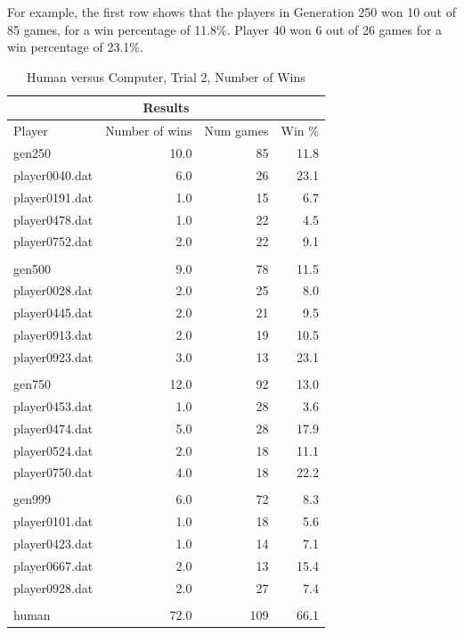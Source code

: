 For example, the first row shows that the players in Generation 250 won 10 out
of 85 games, for a win percentage of 11.8\%. Player 40 won 6 out of 26 games for
a win percentage of 23.1\%.

\begin{table}[htbp]
  \centering
  \caption{Human versus Computer, Trial 2, Number of Wins}
    \begin{tabular}{lrrr}
    \toprule
    \multicolumn{4}{c}{Results} \\
    \midrule
    Player & Number of wins & Num games & Win \% \\
    \midrule
    \multicolumn{1}{l}{gen250}         & 10.0 & 85 & 11.8 \\
    \multicolumn{1}{l}{player0040.dat} & 6.0  & 26 & 23.1 \\
    \multicolumn{1}{l}{player0191.dat} & 1.0  & 15 & 6.7 \\
    \multicolumn{1}{l}{player0478.dat} & 1.0  & 22 & 4.5 \\
    \multicolumn{1}{l}{player0752.dat} & 2.0  & 22 & 9.1 \\ \\
    \multicolumn{1}{l}{gen500}         & 9.0  & 78  & 11.5  \\
    \multicolumn{1}{l}{player0028.dat} & 2.0  & 25  & 8.0  \\
    \multicolumn{1}{l}{player0445.dat} & 2.0  & 21  & 9.5  \\
    \multicolumn{1}{l}{player0913.dat} & 2.0  & 19  & 10.5  \\
    \multicolumn{1}{l}{player0923.dat} & 3.0  & 13  & 23.1  \\ \\
    \multicolumn{1}{l}{gen750}         & 12.0 & 92  & 13.0  \\
    \multicolumn{1}{l}{player0453.dat} & 1.0  & 28  & 3.6  \\
    \multicolumn{1}{l}{player0474.dat} & 5.0  & 28  & 17.9  \\
    \multicolumn{1}{l}{player0524.dat} & 2.0  & 18  & 11.1  \\
    \multicolumn{1}{l}{player0750.dat} & 4.0  & 18  & 22.2  \\ \\
    \multicolumn{1}{l}{gen999}         & 6.0  & 72  & 8.3  \\
    \multicolumn{1}{l}{player0101.dat} & 1.0  & 18  & 5.6  \\
    \multicolumn{1}{l}{player0423.dat} & 1.0  & 14  & 7.1  \\
    \multicolumn{1}{l}{player0667.dat} & 2.0  & 13  & 15.4  \\
    \multicolumn{1}{l}{player0928.dat} & 2.0  & 27  & 7.4  \\ \\
    \multicolumn{1}{l}{human}          & 72.0 & 109 & 66.1  \\
    \bottomrule
    \end{tabular}%
  \label{tab:human_rga_2a}%
\end{table}%

